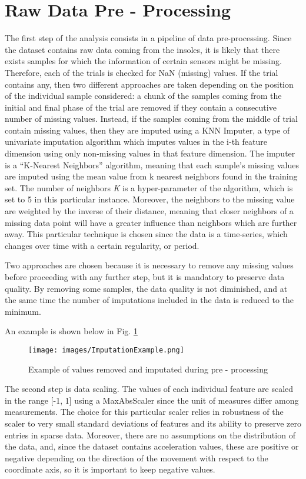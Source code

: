 \section{Raw Data Pre - Processing}
The first step of the analysis consists in a pipeline of data pre-processing. Since the dataset contains raw data coming from the insoles, it is likely that there exists samples for which the information of certain sensors might be missing. Therefore, each of the trials is checked for NaN (missing) values. 
If the trial contains any, then two different approaches are taken depending on the position of the individual sample considered: a chunk of the samples coming from the initial and final phase of the trial are removed if they contain a consecutive number of missing values. Instead, if the samples coming from the middle of trial contain missing values, then they are imputed using a KNN Imputer, a type of univariate imputation algorithm which imputes values in the i-th feature dimension using only non-missing values in that feature dimension.
The imputer is a \enquote{K-Nearest Neighbors} algorithm, meaning that each sample’s missing values are imputed using the mean value from k nearest neighbors found in the training set.
The number of neighbors \textit{K} is a hyper-parameter of the algorithm, which is set to 5 in this particular instance. Moreover, the neighbors to the missing value are weighted by the inverse of their distance, meaning that closer neighbors of a missing data point will have a greater influence than neighbors which are further away. This particular technique is chosen since the data is a time-series, which changes over time with a certain regularity, or period.

Two approaches are chosen because it is necessary to remove any missing values before proceeding with any further step, but it is mandatory to preserve data quality. By removing some samples, the data quality is not diminished, and at the same time the number of imputations included in the data is reduced to the minimum.

An example is shown below in Fig. \ref{fig:imputation}
\begin{figure}[ht!]
    \centering
    \texttt{[image: images/ImputationExample.png]}
    \caption{Example of values removed and imputated during pre - processing}
    \label{fig:imputation}
\end{figure}


The second step is data scaling. The values of each individual feature are scaled in the range [-1, 1] using a MaxAbsScaler since the unit of measures differ among measurements. The choice for this particular scaler relies in robustness of the scaler to very small standard deviations of features and its ability to preserve zero entries in sparse data. Moreover, there are no assumptions on the distribution of the data, and, since the dataset contains acceleration values, these are positive or negative depending on the direction of the movement with respect to the coordinate axis, so it is important to keep negative values.

